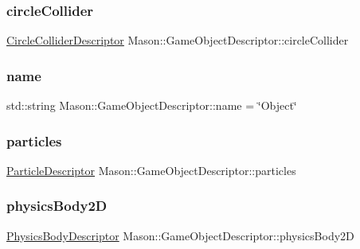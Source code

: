 \subsubsection{\texorpdfstring{circle\+Collider}{circleCollider}}
{\footnotesize\ttfamily \hyperlink{class_mason_1_1_circle_collider_descriptor}{Circle\+Collider\+Descriptor} Mason\+::\+Game\+Object\+Descriptor\+::circle\+Collider}

\hypertarget{class_mason_1_1_game_object_descriptor_aea3fddf12ef08c91e1f5e422c7521e18}{}\label{class_mason_1_1_game_object_descriptor_aea3fddf12ef08c91e1f5e422c7521e18} 
\subsubsection{\texorpdfstring{name}{name}}
{\footnotesize\ttfamily std\+::string Mason\+::\+Game\+Object\+Descriptor\+::name = \char`\"{}Object\char`\"{}}

\hypertarget{class_mason_1_1_game_object_descriptor_aa51c7f6f6a4cb0720c352cd504d4593c}{}\label{class_mason_1_1_game_object_descriptor_aa51c7f6f6a4cb0720c352cd504d4593c} 
\subsubsection{\texorpdfstring{particles}{particles}}
{\footnotesize\ttfamily \hyperlink{class_mason_1_1_particle_descriptor}{Particle\+Descriptor} Mason\+::\+Game\+Object\+Descriptor\+::particles}

\hypertarget{class_mason_1_1_game_object_descriptor_a923994ccf28b36e3349e6355d3d0d6bd}{}\label{class_mason_1_1_game_object_descriptor_a923994ccf28b36e3349e6355d3d0d6bd} 
\subsubsection{\texorpdfstring{physics\+Body2D}{physicsBody2D}}
{\footnotesize\ttfamily \hyperlink{class_mason_1_1_physics_body_descriptor}{Physics\+Body\+Descriptor} Mason\+::\+Game\+Object\+Descriptor\+::physics\+Body2D}

